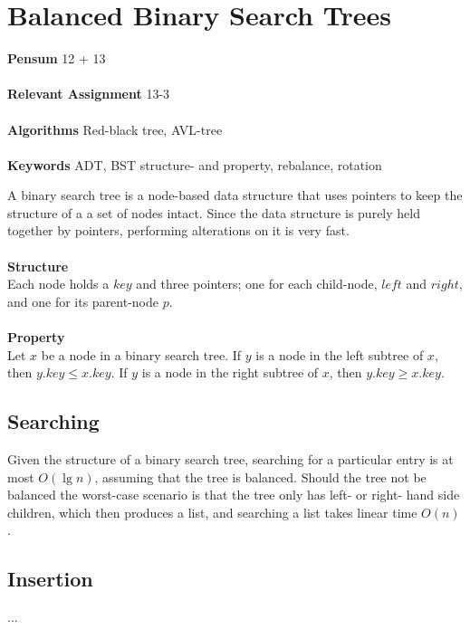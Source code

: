 
\chapter{Balanced Binary Search Trees}
\label{ch:balancedbinarysearchtrees}

\textbf{Pensum} 12 + 13 \cite{clrs} \\\\
\textbf{Relevant Assignment} 13-3 \\\\
\textbf{Algorithms} Red-black tree, AVL-tree \\\\
\textbf{Keywords} ADT, BST structure- and property, rebalance, rotation
\vspace{1in}

\noindent A binary search tree is a node-based data structure that uses
pointers to keep the structure of a a set of nodes intact. Since the data
structure is purely held together by pointers, performing alterations on it
is very fast.
\\\\
\noindent \textbf{Structure} \\
Each node holds a $key$ and three pointers; one for each child-node, $left$
and $right$, and one for its parent-node $p$.
\\\\
\noindent \textbf{Property} \\
Let $x$ be a node in a binary search tree. If $y$ is a node in the left
subtree of $x$, then $y.key \leq x.key$. If $y$ is a node in the right
subtree of $x$, then $y.key \geq x.key$.

\newpage
\section{Searching}
Given the structure of a binary search tree, searching for a particular entry
is at most $O(\lg n)$, assuming that the tree is balanced. Should the tree not
be balanced the worst-case scenario is that the tree only has left- or right-
hand side children, which then produces a list, and searching a list takes
linear time $O(n)$.
 
\section{Insertion}
...


